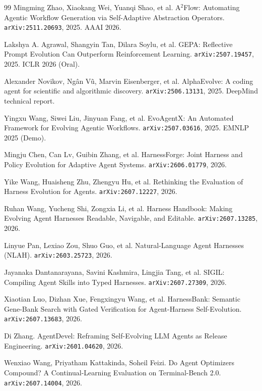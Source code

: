 \begin{thebibliography}{99}
 Mingming Zhao, Xiaokang Wei, Yuanqi Shao, et al.
  A$^2$Flow: Automating Agentic Workflow Generation via Self-Adaptive
  Abstraction Operators. \texttt{arXiv:2511.20693}, 2025. AAAI 2026.

 Lakshya A. Agrawal, Shangyin Tan, Dilara Soylu, et al.
  GEPA: Reflective Prompt Evolution Can Outperform Reinforcement Learning.
  \texttt{arXiv:2507.19457}, 2025. ICLR 2026 (Oral).

 Alexander Novikov, Ng\^{a}n V\~{u}, Marvin
  Eisenberger, et al. AlphaEvolve: A coding agent for scientific and
  algorithmic discovery. \texttt{arXiv:2506.13131}, 2025. DeepMind
  technical report.

 Yingxu Wang, Siwei Liu, Jinyuan Fang, et al.
  EvoAgentX: An Automated Framework for Evolving Agentic Workflows.
  \texttt{arXiv:2507.03616}, 2025. EMNLP 2025 (Demo).

 Mingju Chen, Can Lv, Guibin Zhang, et al.
  HarnessForge: Joint Harness and Policy Evolution for Adaptive Agent
  Systems. \texttt{arXiv:2606.01779}, 2026.

 Yike Wang, Huaisheng Zhu, Zhengyu Hu, et
  al. Rethinking the Evaluation of Harness Evolution for Agents.
  \texttt{arXiv:2607.12227}, 2026.

 Ruhan Wang, Yucheng Shi, Zongxia Li, et al.
  Harness Handbook: Making Evolving Agent Harnesses Readable, Navigable,
  and Editable. \texttt{arXiv:2607.13285}, 2026.

 Linyue Pan, Lexiao Zou, Shuo Guo, et al. Natural-Language
  Agent Harnesses (NLAH). \texttt{arXiv:2603.25723}, 2026.

 Jayanaka Dantanarayana, Savini Kashmira, Lingjia Tang, et
  al. SIGIL: Compiling Agent Skills into Typed Harnesses.
  \texttt{arXiv:2607.27309}, 2026.

 Xiaotian Luo, Dizhan Xue, Fengxingyu Wang, et al.
  HarnessBank: Semantic Gene-Bank Search with Gated Verification for
  Agent-Harness Self-Evolution. \texttt{arXiv:2607.13683}, 2026.

 Di Zhang. AgentDevel: Reframing Self-Evolving LLM
  Agents as Release Engineering. \texttt{arXiv:2601.04620}, 2026.

 Wenxiao Wang, Priyatham Kattakinda, Soheil Feizi. Do
  Agent Optimizers Compound? A Continual-Learning Evaluation on
  Terminal-Bench 2.0. \texttt{arXiv:2607.14004}, 2026.


\end{thebibliography}
